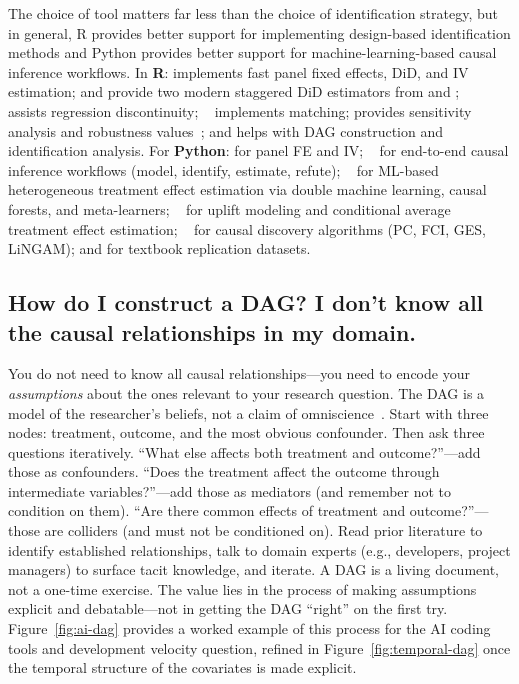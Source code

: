 The choice of tool matters far less than the choice of identification strategy, but in general, R provides better support for implementing design-based identification methods and Python provides better support for machine-learning-based causal inference workflows.
In \textbf{R}:  implements fast panel fixed effects, DiD, and IV estimation;  and  provide two modern staggered DiD estimators from \citet{callaway2021difference} and \citet{borusyak2024revisiting}; ~\cite{calonico2014robust} assists regression discontinuity; ~\cite{ho2007matching} implements matching;  provides sensitivity analysis and robustness values~\cite{cinelli2020making}; and  helps with DAG construction and identification analysis.
For \textbf{Python}:  for panel FE and IV; ~\cite{DBLP:journals/corr/abs-2011-04216} for end-to-end causal inference workflows (model, identify, estimate, refute); ~\cite{econml2019} for ML-based heterogeneous treatment effect estimation via double machine learning, causal forests, and meta-learners; ~\cite{DBLP:journals/softx/ZhaoL23} for uplift modeling and conditional average treatment effect estimation; ~\cite{DBLP:journals/jmlr/ZhengH0RGCSS024} for causal discovery algorithms (PC, FCI, GES, LiNGAM); and  for textbook replication datasets.

\subsection{How do I construct a DAG? I don't know all the causal relationships in my domain.}

You do not need to know all causal relationships---you need to encode your \emph{assumptions} about the ones relevant to your research question.
The DAG is a model of the researcher's beliefs, not a claim of omniscience~\cite{pearl2009causality}.
Start with three nodes: treatment, outcome, and the most obvious confounder.
Then ask three questions iteratively.
``What else affects both treatment and outcome?''---add those as confounders.
``Does the treatment affect the outcome through intermediate variables?''---add those as mediators (and remember not to condition on them).
``Are there common effects of treatment and outcome?''---those are colliders (and must not be conditioned on).
Read prior literature to identify established relationships, talk to domain experts (e.g., developers, project managers) to surface tacit knowledge, and iterate.
A DAG is a living document, not a one-time exercise.
The value lies in the process of making assumptions explicit and debatable---not in getting the DAG ``right'' on the first try.
Figure~\ref{fig:ai-dag} provides a worked example of this process for the AI coding tools and development velocity question, refined in Figure~\ref{fig:temporal-dag} once the temporal structure of the covariates is made explicit.

